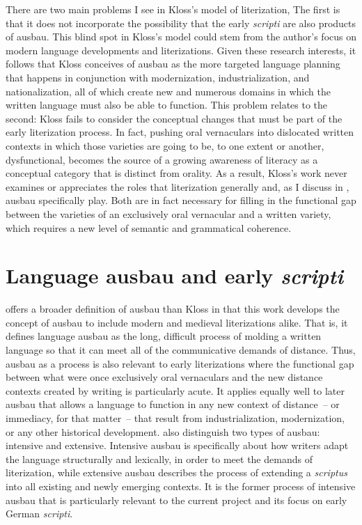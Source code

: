 There are two main problems I see in Kloss’s model of literization, The first is that it does not incorporate the possibility that the early \textit{scripti} are also products of ausbau. This blind spot in Kloss’s model could stem from the author’s focus on modern language developments and literizations. Given these research interests, it follows that Kloss conceives of ausbau as the more targeted language planning that happens in conjunction with modernization, industrialization, and nationalization, all of which create new and numerous domains in which the written language must also be able to function. This problem relates to the second: Kloss fails to consider the conceptual changes that must be part of the early literization process. In fact, pushing oral vernaculars into dislocated written contexts in which those varieties are going to be, to one extent or another, dysfunctional, becomes the source of a growing awareness of literacy as a conceptual category that is distinct from orality. As a result, Kloss’s work never examines or appreciates the roles that literization generally and, as I discuss in , ausbau specifically play. Both are in fact necessary for filling in the functional gap between the varieties of an exclusively oral vernacular and a written variety, which requires a new level of semantic and grammatical coherence.

\section{Language ausbau and early \textit{scripti} }\label{sec:4.2}

\citet[589]{KochOesterreicher1994} offers a broader definition of ausbau than Kloss in that this work develops the concept of ausbau to include modern and medieval literizations alike. That is, it defines language ausbau as the long, difficult process of molding a written language so that it can meet all of the communicative demands of distance. Thus, ausbau as a process is also relevant to early literizations where the functional gap between what were once exclusively oral vernaculars and the new distance contexts created by writing is particularly acute. It applies equally well to later ausbau that allows a language to function in any new context of distance~-- or immediacy, for that matter~-- that result from industrialization, modernization, or any other historical development. \citet[589]{KochOesterreicher1994} also distinguish two types of ausbau: intensive and extensive. Intensive ausbau is specifically about how writers adapt the language structurally and lexically, in order to meet the demands of literization, while extensive ausbau describes the process of extending a \textit{scriptus} into all existing and newly emerging contexts. It is the former process of intensive ausbau that is particularly relevant to the current project and its focus on early German \textit{scripti}.

